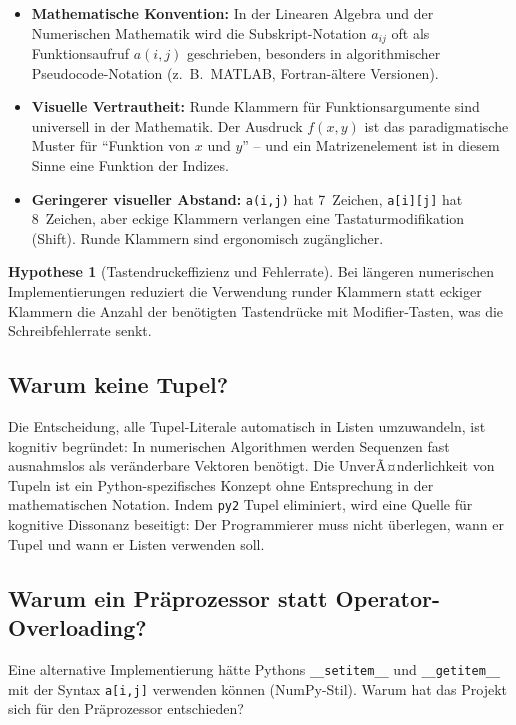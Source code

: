 ﻿\documentclass[a4paper,12pt]{article}
\theoremstyle{definition}
\newtheorem{hypothese}{Hypothese}
\begin{document}
\begin{itemize}
	\item \textbf{Mathematische Konvention:} In der Linearen Algebra und der Numerischen
	      Mathematik wird die Subskript-Notation $a_{ij}$ oft als Funktionsaufruf $a(i,j)$
	      geschrieben, besonders in algorithmischer Pseudocode-Notation (z.\ B.\ MATLAB,
	      Fortran-\"altere Versionen).
	\item \textbf{Visuelle Vertrautheit:} Runde Klammern f\"ur Funktionsargumente sind
	      universell in der Mathematik. Der Ausdruck $f(x, y)$ ist das paradigmatische
	      Muster f\"ur ``Funktion von $x$ und $y$'' -- und ein Matrizenelement ist
	      in diesem Sinne eine Funktion der Indizes.
	\item \textbf{Geringerer visueller Abstand:} \texttt{a(i,j)} hat 7~Zeichen,
	      \texttt{a[i][j]} hat 8~Zeichen, aber eckige Klammern verlangen eine
	      Tastaturmodifikation (Shift). Runde Klammern sind ergonomisch zug\"anglicher.
\end{itemize}

\begin{hypothese}[Tastendruckeffizienz und Fehlerrate]
	Bei l\"angeren numerischen Implementierungen reduziert die Verwendung runder
	Klammern statt eckiger Klammern die Anzahl der ben\"otigten Tastendr\"ucke
	mit Modifier-Tasten, was die Schreibfehlerrate senkt.
\end{hypothese}

\subsection{Warum keine Tupel?}

Die Entscheidung, alle Tupel-Literale automatisch in Listen umzuwandeln, ist kognitiv
begr\"undet: In numerischen Algorithmen werden Sequenzen fast ausnahmslos als
ver\"anderbare Vektoren ben\"otigt. Die UnverÃ¤nderlichkeit von Tupeln ist ein
Python-spezifisches Konzept ohne Entsprechung in der mathematischen Notation.
Indem \texttt{py2} Tupel eliminiert, wird eine Quelle f\"ur kognitive Dissonanz
beseitigt: Der Programmierer muss nicht \"uberlegen, wann er Tupel und wann er
Listen verwenden soll.

\subsection{Warum ein Pr\"aprozessor statt Operator-Overloading?}

Eine alternative Implementierung h\"atte Pythons \texttt{\_\_setitem\_\_} und
\texttt{\_\_getitem\_\_} mit der Syntax \texttt{a[i,j]} verwenden k\"onnen
(NumPy-Stil). Warum hat das Projekt sich f\"ur den Pr\"aprozessor entschieden?
\end{document}
